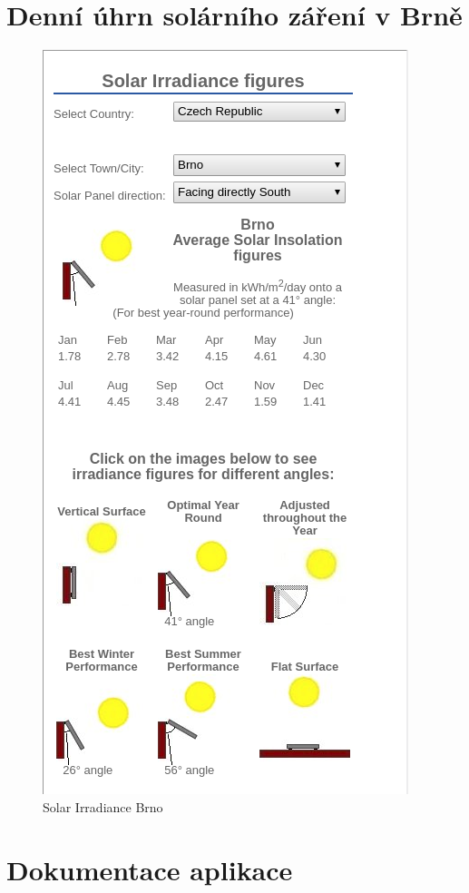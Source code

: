 \chapter{Denní úhrn solárního záření v Brně}
\begin{figure}[!h]
  \begin{center}
    \includegraphics[scale=0.61]{obrazky/solar-irradiance-Brno.png}
  \end{center}
  \caption{Solar Irradiance Brno \cite{solar}}
\end{figure}


\chapter{Dokumentace aplikace}

